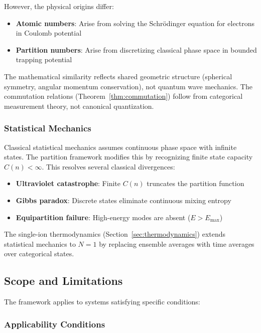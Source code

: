 \documentclass[twocolumn,10pt]{article}
\begin{document}
However, the physical origins differ:
\begin{itemize}
    \item \textbf{Atomic numbers}: Arise from solving the Schrödinger equation for electrons in Coulomb potential
    \item \textbf{Partition numbers}: Arise from discretizing classical phase space in bounded trapping potential
\end{itemize}

The mathematical similarity reflects shared geometric structure (spherical symmetry, angular momentum conservation), not quantum wave mechanics. The commutation relations (Theorem~\ref{thm:commutation}) follow from categorical measurement theory, not canonical quantization.

\subsubsection{Statistical Mechanics}

Classical statistical mechanics assumes continuous phase space with infinite states. The partition framework modifies this by recognizing finite state capacity $C(n) < \infty$. This resolves several classical divergences:

\begin{itemize}
    \item \textbf{Ultraviolet catastrophe}: Finite $C(n)$ truncates the partition function
    \item \textbf{Gibbs paradox}: Discrete states eliminate continuous mixing entropy
    \item \textbf{Equipartition failure}: High-energy modes are absent ($E > E_{\max}$)
\end{itemize}

The single-ion thermodynamics (Section~\ref{sec:thermodynamics}) extends statistical mechanics to $N=1$ by replacing ensemble averages with time averages over categorical states.

\subsection{Scope and Limitations}

The framework applies to systems satisfying specific conditions:

\subsubsection{Applicability Conditions}
\end{document}
